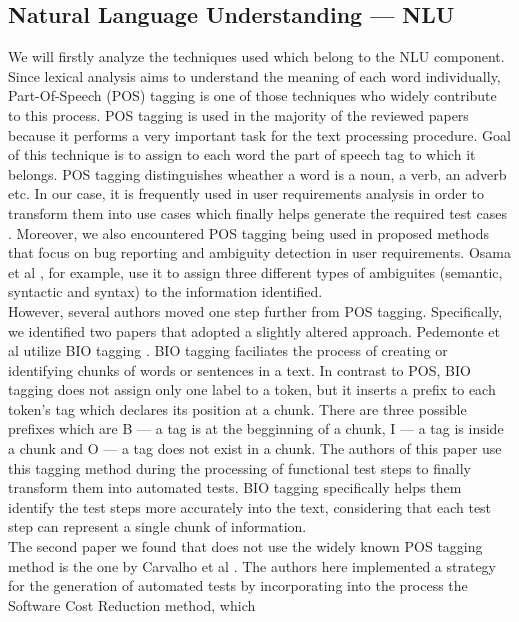 \subsection{Natural Language Understanding --- NLU}
We will firstly analyze the techniques used which belong to the NLU component.
Since lexical analysis aims to understand the meaning of each word individually, Part-Of-Speech (POS) tagging is one of those techniques who widely 
contribute to this process. POS tagging is used in the majority of the reviewed papers because it performs a very important task for the text processing 
procedure. Goal of this technique is to assign to each word the part of speech tag to which it belongs. POS tagging distinguishes wheather a word is 
a noun, a verb, an adverb etc. In our case, it is frequently used in user requirements analysis in order to transform them into use cases which finally 
helps generate the required test cases \cite{allala2019towards, wang2020automatic, rane2017automatic, 8812070, preeti2017building, mulla2020potent}. 
Moreover, we also encountered POS tagging being used in proposed methods that focus on bug reporting and ambiguity detection in user requirements. 
Osama et al \cite{9240680}, for example, use it to assign three different types of ambiguites (semantic, syntactic and syntax) to the information identified. \\
However, several authors moved one step further from POS tagging. Specifically, we identified two papers that adopted a slightly altered approach. 
Pedemonte et al \cite{pedemonte2012towards} utilize BIO tagging \cite{ramshaw1999text}. BIO tagging faciliates the process of creating or identifying chunks of words or sentences in a text. 
In contrast to POS, BIO tagging does not assign only one label to a token, but it inserts a prefix to each token's tag which declares its position 
at a chunk. There are three possible prefixes which are B --- a tag is at the begginning of a chunk, I --- a tag is inside a chunk and O --- 
a tag does not exist in a chunk. The authors of this paper use this tagging method during the processing of functional test steps to finally transform them into 
automated tests. BIO tagging specifically helps them identify the test steps more accurately into the text, considering that each test step can 
represent a single chunk of information.\\
The second paper we found that does not use the widely known POS tagging method is the one by Carvalho et al \cite{carvalho2014nat2testscr}. The 
authors here implemented a strategy for the generation of automated tests by incorporating into the process the Software Cost Reduction method, which 
